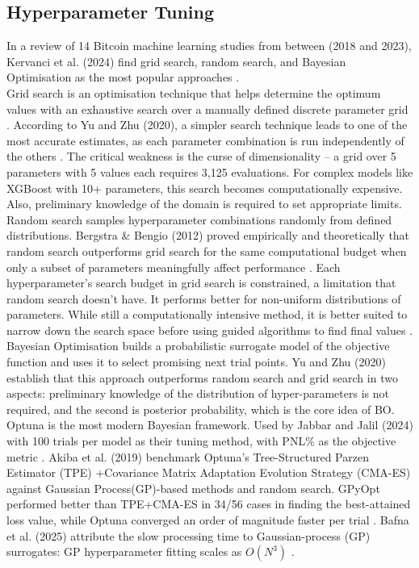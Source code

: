 \subsection{Hyperparameter Tuning}
In a review of 14 Bitcoin machine learning studies from between (2018 and 2023), Kervanci et al. (2024) find grid search, random search, and Bayesian Optimisation as the most popular approaches \cite{kervanciBitcoinPricePrediction2024}.\\
Grid search is an optimisation technique that helps determine the optimum values with an exhaustive search over a manually defined discrete parameter grid \cite{kervanciBitcoinPricePrediction2024}. According to Yu and Zhu (2020), a simpler search technique leads to one of the most accurate estimates, as each parameter combination is run independently of the others \cite{yuHyperParameterOptimizationReview2020}. The critical weakness is the curse of dimensionality -- a grid over 5 parameters with 5 values each requires 3,125 evaluations. For complex models like XGBoost with 10+ parameters, this search becomes computationally expensive. Also, preliminary knowledge of the domain is required to set appropriate limits.\\
Random search samples hyperparameter combinations randomly from defined distributions. Bergstra \& Bengio (2012) proved empirically and theoretically that random search outperforms grid search for the same computational budget when only a subset of parameters meaningfully affect performance \cite{bergstra2012random}. Each hyperparameter’s search budget in grid search is constrained, a limitation that random search doesn't have. It performs better for non-uniform distributions of parameters. While still a computationally intensive method, it is better suited to narrow down the search space before using guided algorithms to find final values \cite{yuHyperParameterOptimizationReview2020}.\\
Bayesian Optimisation builds a probabilistic surrogate model of the objective function and uses it to select promising next trial points. Yu and Zhu (2020)  establish that this approach outperforms random search and grid search in two aspects: preliminary knowledge of the distribution of hyper-parameters is not required, and the second is posterior probability, which is the core idea of BO. Optuna is the most modern Bayesian framework. Used by Jabbar and Jalil (2024) with 100 trials per model as their tuning method, with PNL\% as the objective metric \cite{jabbarComprehensiveAnalysisMachine2024}. Akiba et al. (2019) benchmark Optuna's Tree-Structured Parzen Estimator (TPE) +Covariance Matrix Adaptation Evolution Strategy (CMA-ES) against Gaussian Process(GP)-based methods and random search. GPyOpt performed better than TPE+CMA-ES in 34/56 cases in finding the best-attained loss value, while Optuna converged an order of magnitude faster per trial \cite{akibaOptunaNextgenerationHyperparameter2019}. Bafna et al. (2025) attribute the slow processing time to Gaussian-process (GP) surrogates: GP hyperparameter fitting scales as $O(N^3)$ \cite{bafnaTakingGPOut2025}.
